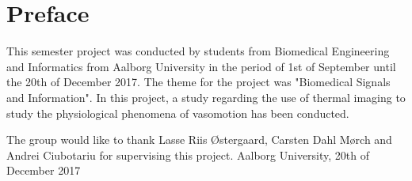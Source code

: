 \chapter*{Preface}

This semester project was conducted by students from Biomedical Engineering and Informatics
from Aalborg University in the period of 1st of September until the 20th of December 2017. The theme for the project was "Biomedical Signals and Information". In this project, a
study regarding the use of thermal imaging to study the physiological phenomena of vasomotion has been conducted.

The group would like to thank Lasse Riis Østergaard, Carsten Dahl Mørch and Andrei Ciubotariu for supervising this project.\newline
Aalborg University, 20th of December 2017
\pagebreak